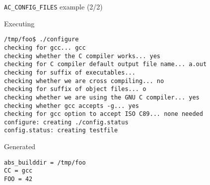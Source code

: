 \begin{frame}[fragile]{{\tt AC\_CONFIG\_FILES} example (2/2)}

\begin{block}{Executing }
\begin{verbatim}
/tmp/foo$ ./configure
checking for gcc... gcc
checking whether the C compiler works... yes
checking for C compiler default output file name... a.out
checking for suffix of executables... 
checking whether we are cross compiling... no
checking for suffix of object files... o
checking whether we are using the GNU C compiler... yes
checking whether gcc accepts -g... yes
checking for gcc option to accept ISO C89... none needed
configure: creating ./config.status
config.status: creating testfile
\end{verbatim}
\end{block}

\begin{block}{Generated }
\begin{verbatim}
abs_builddir = /tmp/foo
CC = gcc
FOO = 42
\end{verbatim}
\end{block}

\end{frame}

